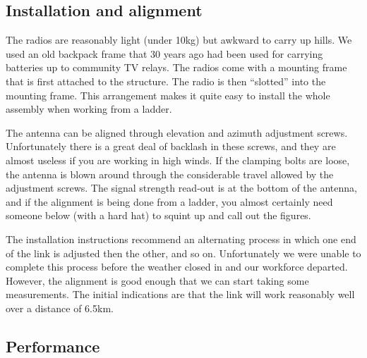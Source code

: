 \subsection{Installation and alignment}
\label{january-2014.-installation-and-alignment}

The radios are reasonably light (under 10kg) but awkward to carry up
hills. We used an old backpack frame that 30 years ago had been used
for carrying batteries up to community TV relays. The radios come with
a mounting frame that is first attached to the structure. The radio is
then ``slotted'' into the mounting frame. This arrangement makes it
quite easy to install the whole assembly when working from a ladder.

The antenna can be aligned through elevation and azimuth
adjustment screws. Unfortunately there is a great deal of backlash in
these screws, and they are almost useless if you are working in high
winds. If the clamping bolts are loose, the antenna is blown around
through the considerable travel allowed by the adjustment screws. The
signal strength read-out is at the bottom of the antenna, and if
the alignment is being done from a ladder, you almost certainly
need someone below (with a hard hat) to squint up and call out
the figures.

The installation instructions recommend an alternating process in which
one end of the link is adjusted then the other, and so
on. Unfortunately we were unable to complete this process before
the weather closed in and our workforce departed. However, the
alignment is good enough that we can start taking some measurements.
The initial indications are that the link will work reasonably well
over a distance of 6.5km.

\subsection{Performance}\label{performance}
